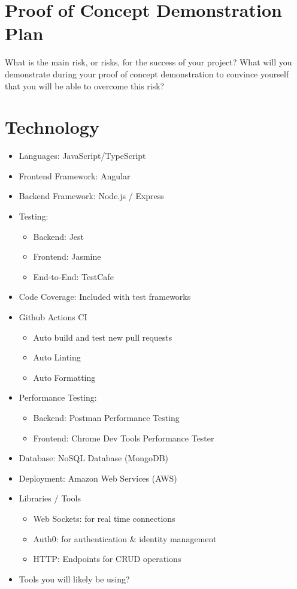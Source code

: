 \documentclass{article}
\begin{document}
\section{Proof of Concept Demonstration Plan}

What is the main risk, or risks, for the success of your project?  What will you
demonstrate during your proof of concept demonstration to convince yourself that
you will be able to overcome this risk?

\section{Technology}

\begin{itemize}
\item Languages: JavaScript/TypeScript
\item Frontend Framework: Angular
\item Backend Framework: Node.js / Express
\item Testing:
   \begin{itemize}
       \item Backend: Jest
       \item Frontend: Jasmine
       \item End-to-End: TestCafe
   \end{itemize}
\item Code Coverage: Included with test frameworks
\item Github Actions CI 
    \begin{itemize}
        \item Auto build and test new pull requests
        \item Auto Linting
        \item Auto Formatting
    \end{itemize}
\item Performance Testing: 
    \begin{itemize}
       \item Backend: Postman Performance Testing
       \item Frontend: Chrome Dev Tools Performance Tester
   \end{itemize}
\item Database: NoSQL Database (MongoDB)
\item Deployment: Amazon Web Services (AWS)
\item Libraries / Tools
\begin{itemize}
    \item Web Sockets: for real time connections
    \item Auth0: for authentication & identity management
    \item HTTP: Endpoints for CRUD operations
\end{itemize}
\item Tools you will likely be using?
\end{itemize}
\end{document}
